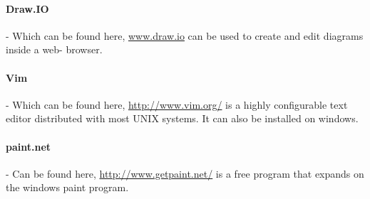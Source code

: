\documentclass[../document]{subfiles}
\begin{document}
\paragraph{Draw.IO} - Which can be found here, \url{www.draw.io} can be used to create and edit diagrams inside a web- browser.

\paragraph{Vim} - Which can be found here, \url{http://www.vim.org/} is a highly configurable text editor distributed with most UNIX systems. It can also be installed on windows.

\paragraph{paint.net} - Can be found here, \url{http://www.getpaint.net/} is a free program that expands on the windows paint program. 
\end{document}
